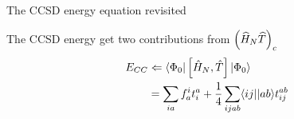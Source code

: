 \begin{frame}{The CCSD energy equation revisited }

    The CCSD energy get two contributions from $\left(\widehat{H}_N \widehat{T}\right)_c$
    \begin{align*}
        E_{CC} & \Leftarrow \langle\Phi_0| \left[ \hat{H}_N, \hat{T} \right] |\Phi_0\rangle \\
            &= \sum_{ia} f_a^i t_i^a + \frac{1}{4} \sum_{ijab} \langle ij||ab\rangle t_{ij}^{ab}
    \end{align*}



\end{frame}

    
